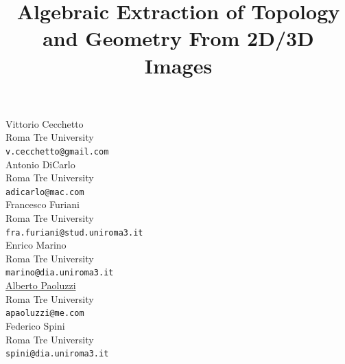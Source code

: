 \documentclass[article,A4,11pt]{llncs}%
\begin{document}
\title{Algebraic Extraction of Topology and Geometry From 2D/3D Images}
 \author{} \institute{}
\maketitle
\begin{center}
{\large Vittorio Cecchetto}\\
Roma Tre University\\
{\tt v.cecchetto@gmail.com}
\\ \vspace{4mm}
{\large Antonio DiCarlo}\\
Roma Tre University\\
{\tt adicarlo@mac.com}
\\ \vspace{4mm}
{\large Francesco Furiani}\\
Roma Tre University\\
{\tt fra.furiani@stud.uniroma3.it}
\\ \vspace{4mm}
{\large Enrico Marino}\\
Roma Tre University\\
{\tt marino@dia.uniroma3.it}
\\ \vspace{4mm}
{\large \underline{Alberto Paoluzzi}}\\
Roma Tre University\\
{\tt apaoluzzi@me.com}
\\ \vspace{4mm}
{\large Federico Spini}\\
Roma Tre University\\
{\tt spini@dia.uniroma3.it}
\end{center}
\end{document}
